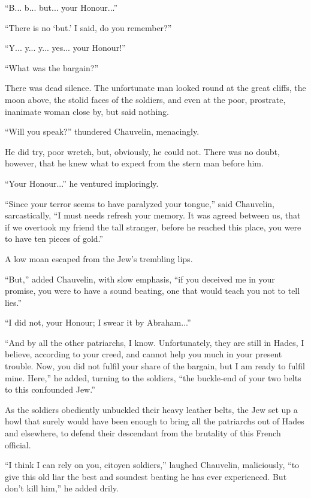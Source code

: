 \documentclass[paper=a5,BCOR=7mm,twoside,DIV=calc,12pt,usegeometry,chapterprefix,endperiod,headings=big]{scrbook}
\begin{document}
\enquote{B... b... but... your Honour...}

\enquote{There is no \enquote{but.} I said, do you remember?}

\enquote{Y... y... y... yes... your Honour!}

\enquote{What was the bargain?}

There was dead silence. The unfortunate man looked round at the great cliffs, the moon above, the stolid faces of the soldiers, and even at the poor, prostrate, inanimate woman close by, but said nothing.

\enquote{Will you speak?} thundered Chauvelin, menacingly.

He did try, poor wretch, but, obviously, he could not. There was no doubt, however, that he knew what to expect from the stern man before him.

\enquote{Your Honour...} he ventured imploringly.

\enquote{Since your terror seems to have paralyzed your tongue,} said Chauvelin, sarcastically, \enquote{I must needs refresh your memory. It was agreed between us, that if we overtook my friend the tall stranger, before he reached this place, you were to have ten pieces of gold.}

A low moan escaped from the Jew's trembling lips.

\enquote{But,} added Chauvelin, with slow emphasis, \enquote{if you deceived me in your promise, you were to have a sound beating, one that would teach you not to tell lies.}

\enquote{I did not, your Honour; I swear it by Abraham...}

\enquote{And by all the other patriarchs, I know. Unfortunately, they are still in Hades, I believe, according to your creed, and cannot help you much in your present trouble. Now, you did not fulfil your share of the bargain, but I am ready to fulfil mine. Here,} he added, turning to the soldiers, \enquote{the buckle-end of your two belts to this confounded Jew.}

As the soldiers obediently unbuckled their heavy leather belts, the Jew set up a howl that surely would have been enough to bring all the patriarchs out of Hades and elsewhere, to defend their descendant from the brutality of this French official.

\enquote{I think I can rely on you, citoyen soldiers,} laughed Chauvelin, maliciously, \enquote{to give this old liar the best and soundest beating he has ever experienced. But don't kill him,} he added drily.
\end{document}
